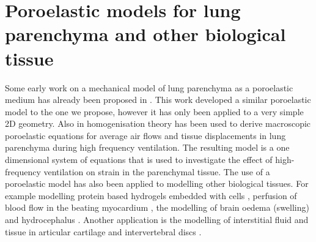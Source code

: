 \section{Poroelastic models for lung parenchyma and other biological tissue}
Some early work on a mechanical model of lung parenchyma as a poroelastic medium has already been proposed in \citet{kowalczyk1993mechanical}. This work developed a similar poroelastic model to the one we propose, however it has only been applied to a very simple 2D geometry. Also in \citet{owen2001mechanics} homogenisation theory has been used to derive macroscopic poroelastic equations for average air flows and tissue displacements in lung parenchyma during high frequency ventilation. The resulting model is a one dimensional system of equations that is used to investigate the effect of high-frequency ventilation on strain in the parenchymal tissue. The use of a poroelastic model has also been applied to modelling other biological tissues. For example modelling protein based hydrogels embedded with cells \citep{galie2011linear}, perfusion of blood flow in the beating myocardium \citep{chapelle2010poroelastic,cookson2011novel}, the modelling of brain oedema (swelling) \citep{li2010three} and hydrocephalus \citep{wirth2006axisymmetric}. Another application is the modelling of interstitial fluid and tissue in articular cartilage and intervertebral discs \citep{mow1980biphasic,holmes1990nonlinear,galbusera2011comparison}.





